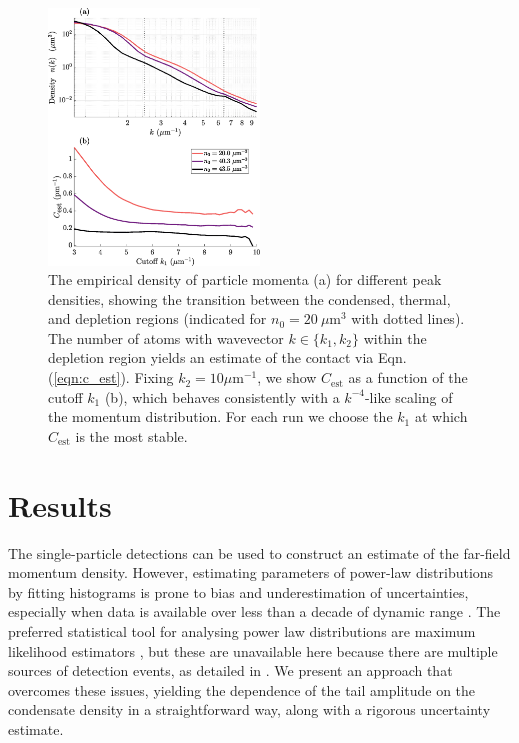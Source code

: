 \begin{figure}[b]
        \includegraphics[width=0.5\textwidth]{fig/QD/contact_determination}
        \caption{The empirical density of particle momenta (a) for different peak densities, showing the transition between the condensed, thermal, and depletion regions (indicated for $n_0=20~\mu\textrm{m}^{3}$ with dotted lines). The number of atoms with wavevector $k\in\{k_1,k_2\}$ within the depletion region yields an estimate of the contact via Eqn. (\ref{eqn:c_est}). Fixing $k_2=10\mu\textrm{m}^{-1}$, we show $C_\textrm{est}$ as a function of the cutoff $k_1$ (b), which behaves consistently with a $k^{-4}$-like scaling of the momentum distribution. For each run we choose the $k_1$ at which $C_\textrm{est}$ is the most stable.}
        \label{fig:cdfplot}
\end{figure}

\section{Results} 
The single-particle detections can be used to construct an estimate of the far-field momentum density. However, estimating parameters of power-law distributions by fitting histograms is prone to bias and underestimation of uncertainties, especially when data is available over less than a decade of dynamic range \cite{clauset09,virkar14}. The preferred statistical tool for analysing power law distributions are maximum likelihood estimators \cite{goldstein04,clauset09,virkar14,hanel17}, but these are unavailable here because there are multiple sources of detection events, as detailed in \cite{SOM}. We present an approach that overcomes these issues, yielding the dependence of the tail amplitude on the condensate density in a straightforward way, along with a rigorous uncertainty estimate. 


